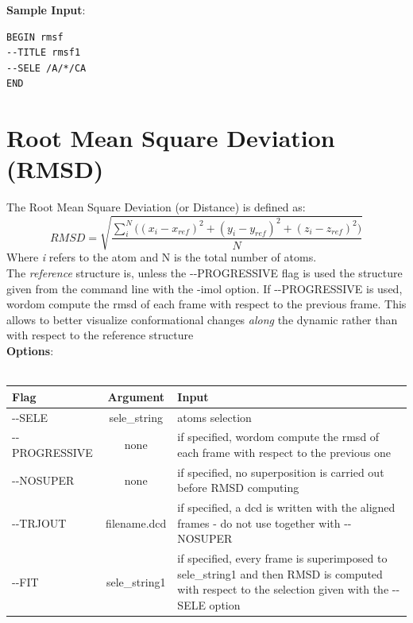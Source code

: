 \documentclass[11pt,twoside,onecolumn,a4paper,openright,notitlepage]{book}[2001/04/21]
\begin{document}
\textbf{\large Sample Input}:
\begin{verbatim}
BEGIN rmsf
--TITLE rmsf1
--SELE /A/*/CA
END
\end{verbatim}
\clearpage

\section{Root Mean Square Deviation (RMSD)}
The Root Mean Square Deviation (or Distance) is defined as:\\ 
\begin{equation}
RMSD = \sqrt{\frac{\sum_{i}^N\Big((x_{i}-x_{ref})^{2}+(y_{i}-y_{ref})^{2}+(z_{i}-z_{ref})^{2}\Big)}{N}}
\end{equation}
Where \emph{i} refers to the atom and N is the total number of atoms.\\
The \emph{reference} structure is, unless the -{}-PROGRESSIVE flag is used the structure given from the command line with the -imol option. If -{}-PROGRESSIVE is used, wordom compute the rmsd of each frame with respect to the previous frame. This allows to better visualize conformational changes \emph{along} the dynamic rather than with respect to the reference structure\\

\textbf{\large Options}:\\\\
\begin{tabular}{l|c|p{7.5cm}}
Flag & Argument & Input \\
\hline
-{}-SELE          & sele\_string  & atoms selection\\
-{}-PROGRESSIVE   & none          & if specified, wordom compute the rmsd of each frame with respect to the previous one\\
-{}-NOSUPER       & none          & if specified, no superposition is carried out before RMSD computing\\
-{}-TRJOUT        & filename.dcd  & if specified, a dcd is written with the aligned frames - do not use together with -{}-NOSUPER\\
-{}-FIT           & sele\_string1 & if specified, every frame is superimposed to sele\_string1 and then RMSD is computed with respect to the selection given with the -{}-SELE option \\
\end{tabular}\\\\
\end{document}
